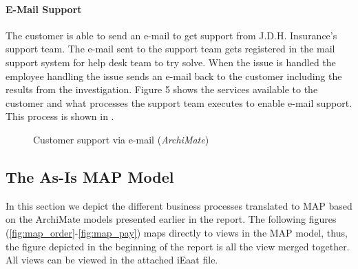 \paragraph{E-Mail Support}
\label{sec:mail_support}
The customer is able to send an e-mail to get support from J.D.H. Insurance's support team. The e-mail sent to the support team gets registered in the mail support system for help desk team to try solve. When the issue is handled the employee handling the issue sends an e-mail back to the customer including the results from the investigation. Figure 5 shows the services available to the customer and what processes the support team executes to enable e-mail support. This process is shown in .
\begin{center}
	\begin{figure}[H]
		\centering
		\setlength\fboxsep{7pt}
		\setlength\fboxrule{0.5pt}
		\caption{Customer support via e-mail (\emph{ArchiMate})}
		\label{fig:archi_mail}
	\end{figure}
\end{center}
%
\subsection{The As-Is MAP Model}
\label{sec:as_is_map_model}
In this section we depict the different business processes translated to MAP based on the ArchiMate models presented earlier in the report. The following figures (\ref{fig:map_order}-\ref{fig:map_pay}) maps directly to views in the MAP model, thus, the figure depicted in the beginning of the report is all the view merged together. All views can be viewed in the attached iEaat file.
